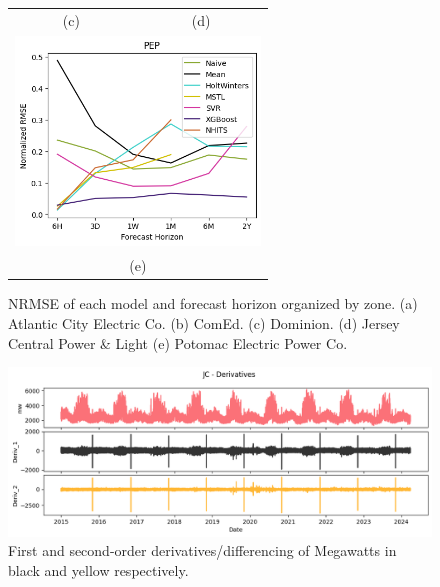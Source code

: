 \documentclass[sigconf]{acmart}
\begin{document}
\begin{figure}
\begin{tabular}{cc}
(c) & (d) \\[6pt]
\multicolumn{2}{c}{\includegraphics[width=65mm]{Images/NRMSE_Zone_PEP.png} }\\
\multicolumn{2}{c}{(e)}
\end{tabular}
\caption{NRMSE of each model and forecast horizon organized by zone. (a) Atlantic City Electric Co. (b) ComEd. (c) Dominion. (d) Jersey Central Power \& Light (e) Potomac Electric Power Co.}
\Description{}
\label{fig:resultszone}
\end{figure}
  
  \begin{figure}[hbt!]
    \centering
    \includegraphics[width=\columnwidth]{Images/Deriv_Plot.png}
    \caption{First and second-order derivatives/differencing of Megawatts in black and yellow respectively.}
    \Description{}
    \label{fig:deriv}
  \end{figure}
\end{document}
